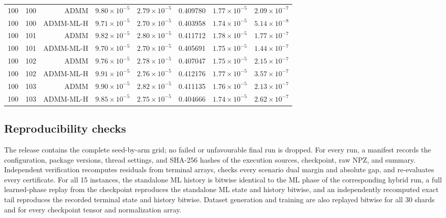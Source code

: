 \documentclass[preprint,12pt,3p]{elsarticle}
\theoremstyle{definition}
\begin{document}
\begin{longtable}{rrrrrrrr}
\midrule
100 & 100 & ADMM & $9.80\times 10^{-5}$ & $2.79\times 10^{-5}$ & 0.409780 & $1.77\times 10^{-5}$ & $2.09\times 10^{-7}$ \\
100 & 100 & ADMM-ML-H & $9.71\times 10^{-5}$ & $2.70\times 10^{-5}$ & 0.403958 & $1.74\times 10^{-5}$ & $5.14\times 10^{-8}$ \\
\midrule
100 & 101 & ADMM & $9.82\times 10^{-5}$ & $2.80\times 10^{-5}$ & 0.411712 & $1.78\times 10^{-5}$ & $1.77\times 10^{-7}$ \\
100 & 101 & ADMM-ML-H & $9.70\times 10^{-5}$ & $2.70\times 10^{-5}$ & 0.405691 & $1.75\times 10^{-5}$ & $1.44\times 10^{-7}$ \\
\midrule
100 & 102 & ADMM & $9.76\times 10^{-5}$ & $2.78\times 10^{-5}$ & 0.407047 & $1.75\times 10^{-5}$ & $2.15\times 10^{-7}$ \\
100 & 102 & ADMM-ML-H & $9.91\times 10^{-5}$ & $2.76\times 10^{-5}$ & 0.412176 & $1.77\times 10^{-5}$ & $3.57\times 10^{-7}$ \\
\midrule
100 & 103 & ADMM & $9.90\times 10^{-5}$ & $2.82\times 10^{-5}$ & 0.411135 & $1.76\times 10^{-5}$ & $2.13\times 10^{-7}$ \\
100 & 103 & ADMM-ML-H & $9.85\times 10^{-5}$ & $2.75\times 10^{-5}$ & 0.404666 & $1.74\times 10^{-5}$ & $2.62\times 10^{-7}$ \\
\end{longtable}
\endgroup

\subsection{Reproducibility checks}
The release contains the complete seed-by-arm grid; no failed or unfavourable final run is dropped. For every run, a manifest records the configuration, package versions, thread settings, and SHA-256 hashes of the execution sources, checkpoint, raw NPZ, and summary. Independent verification recomputes residuals from terminal arrays, checks every scenario dual margin and absolute gap, and re-evaluates every certificate. For all 15 instances, the standalone ML history is bitwise identical to the ML phase of the corresponding hybrid run, a full learned-phase replay from the checkpoint reproduces the standalone ML state and history bitwise, and an independently recomputed exact tail reproduces the recorded terminal state and history bitwise. Dataset generation and training are also replayed bitwise for all 30 shards and for every checkpoint tensor and normalization array.
\end{document}
